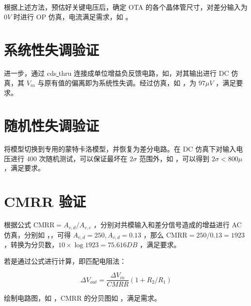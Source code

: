 \documentclass[lang=cn,11pt,a4paper,cite=authoryear]{elegantpaper}
\begin{document}


根据上述方法，预估好关键电压后，确定 OTA 的各个晶体管尺寸，对差分输入为 \(0 V\) 时进行 OP 仿真，电流满足需求，如  。



\section{系统性失调验证}

进一步，通过 cds\underline{ }thru 连接成单位增益负反馈电路，如，对其输出进行 DC 仿真，其 \(V_{in}\) 与原有值的偏离即为系统性失调。经过仿真，如  ，为 \(97 \mu V\) ，满足要求。



\section{随机性失调验证}

将模型切换到专用的蒙特卡洛模型，并恢复为差分电路。在 DC 仿真下对输入电压进行 400 次随机测试，可以保证最坏在 \(2 \sigma\) 范围外，如  ，可以得到 \(2 \sigma < 800 \mu\) ，满足要求。


\section{CMRR 验证}

根据公式 \(\text{CMRR} = A_{v,d}/A_{v,c}\) ，分别对共模输入和差分信号造成的增益进行 AC 仿真，分别如 ，，可得 \(A_{v,d} = 250, A_{v,d} = 0.13\) ，那么 \(\text{CMRR} = 250 / 0.13 = 1923\) ，转换为分贝数，\(10 \times \log 1923 = 75.616 DB\) ，满足要求。




若是通过公式进行计算，即匹配电阻法：

\[\Delta V_{out} = \frac{\Delta V_{in}}{CMRR} (1 + R_2 / R_1) \] 

绘制电路图，如  ，CMRR 的分贝图如  ，满足需求。



\end{document}

